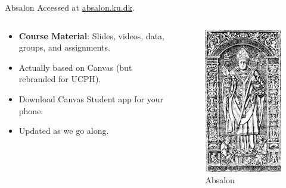 \documentclass[
  ignorenonframetext,
  aspectratio=1610,
  onlytextwidth]{beamer}
\providecommand{\tightlist}{}
\begin{document}
\begin{frame}{Absalon}
\label{absalon}
Accessed at \href{https://absalon.ku.dk/}{absalon.ku.dk}.

\begin{columns}[T]
\begin{column}{0.47\linewidth}
\begin{itemize}[<+->]
\tightlist
\item
  \textbf{Course Material}: Slides, videos, data, groups, and
  assignments.
\item
  Actually based on Canvas (but rebranded for UCPH).
\item
  Download Canvas Student app for your phone.
\item
  Updated as we go along.
\end{itemize}
\end{column}

\begin{column}{0.47\linewidth}
\begin{figure}[H]

{\centering \includegraphics[width=0.5\linewidth,height=\textheight,keepaspectratio]{../images/absalon.jpg}

}

\caption{Absalon}

\end{figure}%
\end{column}
\end{columns}
\end{frame}
\end{document}
